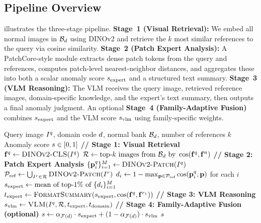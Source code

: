 \subsection{Pipeline Overview}
\label{sec:overview}

 illustrates the three-stage pipeline.
\textbf{Stage~1 (Visual Retrieval):} We embed all normal images in $\mathcal{B}_d$ using DINOv2 and retrieve the $k$ most similar references to the query via cosine similarity.
\textbf{Stage~2 (Patch Expert Analysis):} A PatchCore-style module extracts dense patch tokens from the query and references, computes patch-level nearest-neighbor distances, and aggregates these into both a scalar anomaly score $s_{\text{expert}}$ and a structured text summary.
\textbf{Stage~3 (VLM Reasoning):} The VLM receives the query image, retrieved reference images, domain-specific knowledge, and the expert's text summary, then outputs a final anomaly judgment.
An optional \textbf{Stage~4 (Family-Adaptive Fusion)} combines $s_{\text{expert}}$ and the VLM score $s_{\text{vlm}}$ using family-specific weights.

\begin{algorithm}[t]
\caption{AnomaClaw inference pipeline}
\label{alg:pipeline}
\begin{algorithmic}[1]
\REQUIRE Query image $I^q$, domain code $d$, normal bank $\mathcal{B}_d$, number of references $k$
\ENSURE Anomaly score $s \in [0,1]$
\STATE \textbf{// Stage 1: Visual Retrieval}
\STATE $\mathbf{f}^q \gets \textsc{DINOv2-CLS}(I^q)$
\STATE $\mathcal{R} \gets \text{top-}k \text{ images from } \mathcal{B}_d \text{ by } \cos(\mathbf{f}^q, \mathbf{f}^n)$
\STATE \textbf{// Stage 2: Patch Expert Analysis}
\STATE $\{\mathbf{p}^q_i\}_{i=1}^{M} \gets \textsc{DINOv2-Patch}(I^q)$
\STATE $\mathcal{P}_{\text{ref}} \gets \bigcup_{I^r \in \mathcal{R}} \textsc{DINOv2-Patch}(I^r)$
\STATE $d_i \gets 1 - \max_{\mathbf{p} \in \mathcal{P}_{\text{ref}}} \cos(\mathbf{p}^q_i, \mathbf{p})$ for each $i$
\STATE $s_{\text{expert}} \gets \text{mean of top-}1\%\text{ of } \{d_i\}_{i=1}^{M}$
\STATE $t_{\text{expert}} \gets \textsc{FormatSummary}(s_{\text{expert}}, \cos(\mathbf{f}^q, \mathbf{f}^{r_1}))$
\STATE \textbf{// Stage 3: VLM Reasoning}
\STATE $s_{\text{vlm}} \gets \textsc{VLM}(I^q, \mathcal{R}, t_{\text{expert}}, t_{\text{domain}})$
\STATE \textbf{// Stage 4: Family-Adaptive Fusion (optional)}
    \STATE $s \gets \alpha_{\mathcal{F}(d)} \cdot s_{\text{expert}} + (1 - \alpha_{\mathcal{F}(d)}) \cdot s_{\text{vlm}}$
\RETURN $s$
\end{algorithmic}
\end{algorithm}

